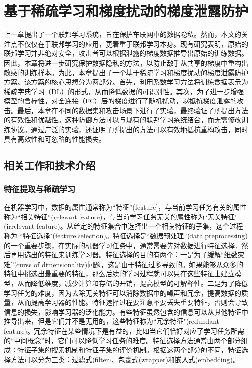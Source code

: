 \setlength{\baselineskip}{20pt}
\chapter{基于稀疏学习和梯度扰动的梯度泄露防护}
\label{cha:chap4}

上一章提出了一个联邦学习系统，旨在保护车联网中的数据隐私。然而，本文的关注点不仅仅在于联邦学习的应用，更着重于联邦学习本身。现有研究表明，原始的联邦学习并非绝对安全，攻击者可以根据泄露的梯度数据推导出原始的训练数据。因此，本章将进一步研究保护数据隐私的方法，以防止敌手从共享的梯度中重构出敏感的训练样本。为此，本章提出了一个基于稀疏学习和梯度扰动的梯度泄露防护方案。该方案的核心思想分为两部分。首先，利用系数学习方法将训练数据表示为稀疏字典学习（DL）的形式，从而降低数据的可识别性。其次，为了进一步增强模型的鲁棒性，对全连接（FC）层的梯度进行了随机扰动，以抵抗梯度泄露的攻击。最后，本章在不同的数据集和攻击场景下进行了实验，最终验证了所提出方法的有效性和优越性。这种防御方法可以与现有的联邦学习系统结合，而无需修改训练协议。通过广泛的实验，还证明了所提出的方法可以有效地抵抗重构攻击，同时具有高效性和可忽略的性能损失。

\section{相关工作和技术介绍}

\subsection{特征提取与稀疏学习}

在机器学习中，数据的属性通常称为“特征”(feature)，与当前学习任务有关的属性称为“相关特征”(relevant feature)，与当前学习任务无关的属性称为“无关特征" (irrelevant feature)。从给定的特征集合中选择出一个相关特征的子集，这个过程称为 “特征选择"(feature selection)。特征选择是“数据预处理”(data preprocessing)的一个重要步骤，在实际的机器学习任务中，通常需要先对数据进行特征选择，然后再用选出的特征来训练学习器。特征选择的目的有两个：一是为了缓解“维数灾难”(curse of dimensionality)问题，这是由于特征过多导致的。如果能够从众多的特征中挑选出最重要的特征，那么后续的学习过程就可以只在这些特征上建立模型，从而降低维度，减少计算和存储的开销，提高模型的可解释性。二是为了降低学习任务的难度，因为去除无关特征可以消除数据中的噪声和冗余，提高数据的质量，从而提高学习器的性能。特征选择过程要注意不要丢失重要特征，否则会导致信息的损失，影响学习器的泛化能力。有些特征虽然包含的信息可以从其他特征中推导出来，但是它们并不是无用的，这些特征称为“冗余特征"(redundant feature)。冗余特征在某些情况下是有益的，比如当它们恰好对应了学习任务所需的“中间概念”时，它们可以降低学习任务的难度。特征选择方法通常由两个部分组成：特征子集的搜索机制和特征子集的评价机制。根据这两个部分的不同，特征选择方法可以分为三类：过滤式(filter)、包裹式(wrapper)和嵌入式(embedding)。

